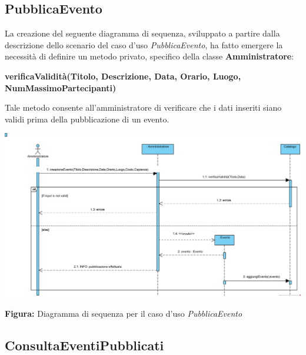 \subsection{PubblicaEvento}

\begin{center}
    La creazione del seguente diagramma di sequenza, sviluppato a partire dalla descrizione dello scenario del caso \noindent d’uso \textit{PubblicaEvento}, ha fatto emergere la necessità di definire un metodo privato, specifico della classe \textbf{Amministratore}:

    \vspace{1ex}
    \textbf{verificaValidità(Titolo, Descrizione, Data, Orario, Luogo, NumMassimoPartecipanti)}
    
    \vspace{2ex}
    Tale metodo consente all’amministratore di verificare che i dati inseriti siano validi prima della pubblicazione di un evento.

    \vspace{3ex}
    \includegraphics[width=\linewidth]{assets/casid'uso/PubblicaEvento.png}
    
    \vspace{1ex}
    \textbf{Figura:} Diagramma di sequenza per il caso d’uso \textit{PubblicaEvento}
\end{center}


\subsection{ConsultaEventiPubblicati}

